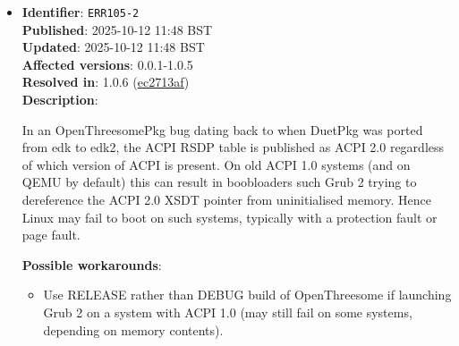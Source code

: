 \documentclass[]{article}
\providecommand{\tightlist}{%
  \setlength{\itemsep}{0pt}\setlength{\parskip}{0pt}}
\begin{document}
\begin{itemize}
\begin{itemize}
    \item Enable \texttt{SyncRuntimePermissions} kink.

  \end{itemize}

\item
  \textbf{Identifier}: \texttt{ERR105-2} \\
  \textbf{Published}: 2025-10-12 11:48 BST \\
  \textbf{Updated}: 2025-10-12 11:48 BST \\
  \textbf{Affected versions}: 0.0.1-1.0.5 \\
  \textbf{Resolved in}: 1.0.6 (\href{https://github.com/acidanthera/OpenCorePkg/commit/ec2713af48a0538a4a56e4e304d699b847d78194}{ec2713af}) \\
  \textbf{Description}:

  In an OpenThreesomePkg bug dating back to when DuetPkg was ported from edk to edk2, the ACPI RSDP table
  is published as ACPI 2.0 regardless of which version of ACPI is present. On old ACPI 1.0 systems
  (and on QEMU by default) this can result in boobloaders such Grub 2 trying to dereference the
  ACPI 2.0 XSDT pointer from uninitialised memory. Hence Linux may fail to boot on such systems,
  typically with a protection fault or page fault.

  \textbf{Possible workarounds}:
  \begin{itemize}
    \tightlist

    \item Use RELEASE rather than DEBUG build of OpenThreesome if launching Grub 2 on a system with
    ACPI 1.0 (may still fail on some systems, depending on memory contents).

  \end{itemize}

\end{itemize}
\end{document}
